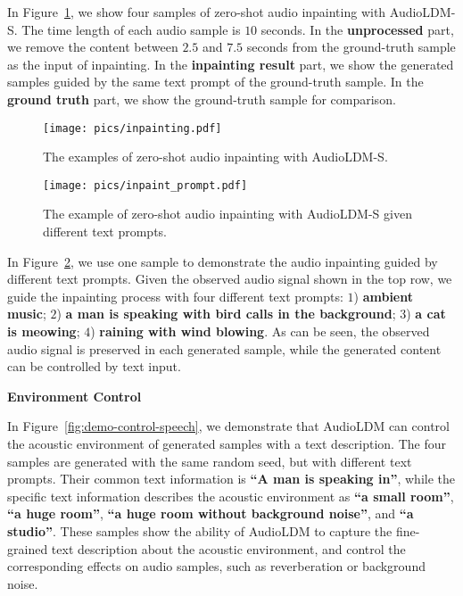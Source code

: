 \documentclass{article}
\begin{document}
In Figure~\ref{fig:demo-inpainting}, we show four samples of zero-shot audio inpainting with AudioLDM-S. The time length of each audio sample is $10$ seconds. In the \textbf{unprocessed} part, we remove the content between $2.5$ and $7.5$ seconds from the ground-truth sample as the input of inpainting. In the \textbf{inpainting result} part, we show the generated samples guided by the same text prompt of the ground-truth sample. In the \textbf{ground truth} part, we show the ground-truth sample for comparison.

\vspace{0.5cm}

\begin{figure}[htbp]
    \centering
    \texttt{[image: pics/inpainting.pdf]}
    \caption{The examples of zero-shot audio inpainting with AudioLDM-S.}
    \label{fig:demo-inpainting}
\vspace{0.5cm}
\end{figure}

\begin{figure}[htbp]
    \centering
    \texttt{[image: pics/inpaint\_prompt.pdf]}
    \caption{The example of zero-shot audio inpainting with AudioLDM-S given different text prompts.}
    \label{fig:demo-inpainting-prompt}
\vspace{0.5cm}
\end{figure}


In Figure~\ref{fig:demo-inpainting-prompt}, we use one sample to demonstrate the audio inpainting guided by different text prompts. Given the observed audio signal shown in the top row, we guide the inpainting process with four different text prompts: $1$) \textbf{ambient music}; $2$) \textbf{a man is speaking with bird calls in the background}; $3$) \textbf{a cat is meowing}; $4$) \textbf{raining with wind blowing}. As can be seen, the observed audio signal is preserved in each generated sample, while the generated content can be controlled by text input.   

\newpage

\vspace{0.5cm}

\textbf{Environment Control}

In Figure~\ref{fig:demo-control-speech}, we demonstrate that AudioLDM can control the acoustic environment of generated samples with a text description. The four samples are generated with the same random seed, but with different text prompts. Their common text information is \textbf{``A man is speaking in''}, while the specific text information describes the acoustic environment as \textbf{``a small room''}, \textbf{``a huge room''}, \textbf{``a huge room without background noise''}, and \textbf{``a studio''}. These samples show the ability of AudioLDM to capture the fine-grained text description about the acoustic environment, and control the corresponding effects on audio samples, such as reverberation or background noise.   
\vspace{0.5cm}
\end{document}
